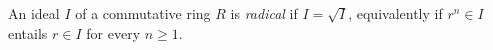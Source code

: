 
An ideal $I$ of a commutative ring $R$ is \emph{radical} if $I=\sqrt I$, equivalently if $r^n\in I$ entails $r\in I$ for every $n\ge1$.
